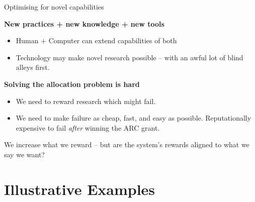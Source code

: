 \documentclass[aspectratio=169, 11pt]{beamer} %
\begin{document}

\begin{frame}{Optimising for novel capabilities}

\textbf{New practices + new knowledge + new tools }
\begin{itemize}
    \item Human + Computer can extend capabilities of both
    \item Technology may make novel research possible -- with an awful lot of blind alleys first.
\end{itemize}

\textbf{Solving the allocation problem is hard}
\begin{itemize}
    \item We need to reward research which might fail.
    \item We need to make failure as cheap, fast, and easy as possible. Reputationally expensive to fail \textit{after} winning the ARC grant.
\end{itemize}

We increase what we reward -- but are the system's rewards aligned to what we say we want? \parencite{Beer2002-tl}
\end{frame}

\section{Illustrative Examples}%
\end{document}
